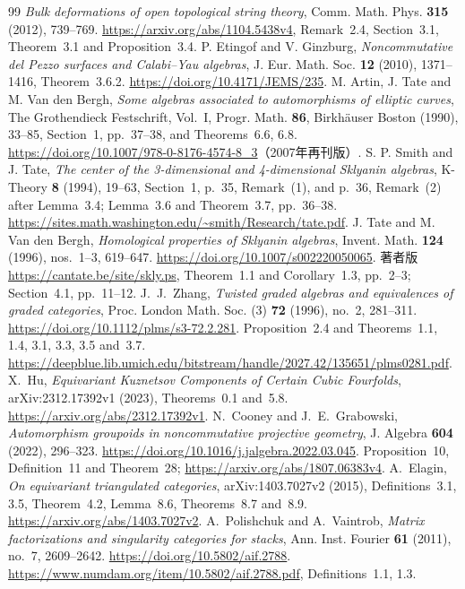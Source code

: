 \begin{thebibliography}{99}
\emph{Bulk deformations of open topological string theory},
Comm. Math. Phys. \textbf{315} (2012), 739--769.
\url{https://arxiv.org/abs/1104.5438v4},
Remark~2.4, Section~3.1, Theorem~3.1 and Proposition~3.4.
 P. Etingof and V. Ginzburg,
\emph{Noncommutative del Pezzo surfaces and Calabi--Yau algebras},
J. Eur. Math. Soc. \textbf{12} (2010), 1371--1416, Theorem~3.6.2.
\url{https://doi.org/10.4171/JEMS/235}.
 M. Artin, J. Tate and M. Van den Bergh,
\emph{Some algebras associated to automorphisms of elliptic curves},
The Grothendieck Festschrift, Vol.~I, Progr. Math. \textbf{86},
Birkh\"auser Boston (1990), 33--85,
Section~1, pp.~37--38, and Theorems~6.6, 6.8.
\url{https://doi.org/10.1007/978-0-8176-4574-8_3}（2007年再刊版）.
 S. P. Smith and J. Tate,
\emph{The center of the 3-dimensional and 4-dimensional Sklyanin algebras},
K-Theory \textbf{8} (1994), 19--63,
Section~1, p.~35, Remark~(1), and p.~36, Remark~(2) after Lemma~3.4;
Lemma~3.6 and Theorem~3.7, pp.~36--38.
\url{https://sites.math.washington.edu/~smith/Research/tate.pdf}.
 J. Tate and M. Van den Bergh,
\emph{Homological properties of Sklyanin algebras},
Invent. Math. \textbf{124} (1996), nos.~1--3, 619--647.
\url{https://doi.org/10.1007/s002220050065}.
著者版\url{https://cantate.be/site/skly.ps},
Theorem~1.1 and Corollary~1.3, pp.~2--3; Section~4.1, pp.~11--12.
J.~J.~Zhang,
\emph{Twisted graded algebras and equivalences of graded categories},
Proc. London Math. Soc. (3) \textbf{72} (1996), no.~2, 281--311.
\url{https://doi.org/10.1112/plms/s3-72.2.281}.
Proposition~2.4 and Theorems~1.1, 1.4, 3.1, 3.3, 3.5 and~3.7.
\url{https://deepblue.lib.umich.edu/bitstream/handle/2027.42/135651/plms0281.pdf}.
X.~Hu,
\emph{Equivariant Kuznetsov Components of Certain Cubic Fourfolds},
arXiv:2312.17392v1 (2023), Theorems~0.1 and~5.8.
\url{https://arxiv.org/abs/2312.17392v1}.
N.~Cooney and J.~E.~Grabowski,
\emph{Automorphism groupoids in noncommutative projective geometry},
J. Algebra \textbf{604} (2022), 296--323.
\url{https://doi.org/10.1016/j.jalgebra.2022.03.045}.
Proposition~10, Definition~11 and Theorem~28;
\url{https://arxiv.org/abs/1807.06383v4}.
A.~Elagin,
\emph{On equivariant triangulated categories},
arXiv:1403.7027v2 (2015), Definitions~3.1, 3.5, Theorem~4.2,
Lemma~8.6, Theorems~8.7 and~8.9.
\url{https://arxiv.org/abs/1403.7027v2}.
A.~Polishchuk and A.~Vaintrob,
\emph{Matrix factorizations and singularity categories for stacks},
Ann. Inst. Fourier \textbf{61} (2011), no.~7, 2609--2642.
\url{https://doi.org/10.5802/aif.2788}.
\url{https://www.numdam.org/item/10.5802/aif.2788.pdf},
Definitions~1.1, 1.3.


\end{thebibliography}
